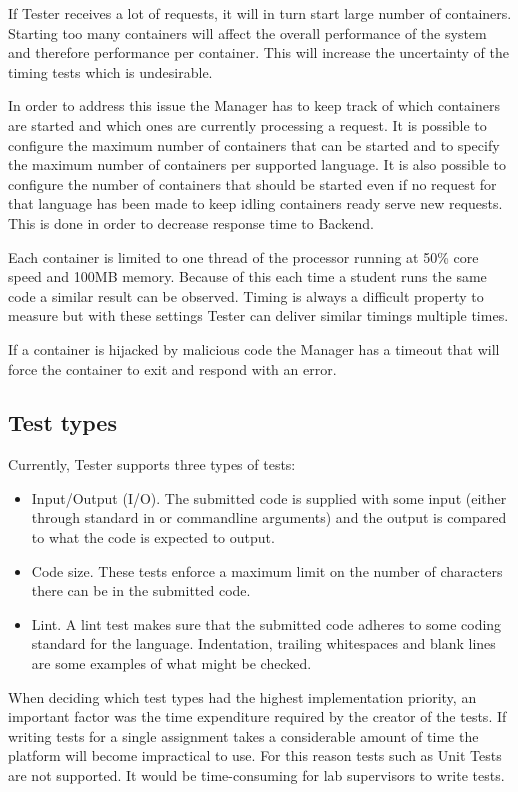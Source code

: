 If Tester receives a lot of requests, it will in turn start large number of containers. Starting too many containers will affect the overall performance of the system and therefore performance per container. This will increase the uncertainty of the timing tests which is undesirable.

In order to address this issue the Manager has to keep track of which containers are started and which ones are currently processing a request. It is possible to configure the maximum number of containers that can be started and to specify the maximum number of containers per supported language. It is also possible to configure the number of containers that should be started even if no request for that language has been made to keep idling containers ready serve new requests. This is done in order to decrease response time to Backend.

Each container is limited to one thread of the processor running at 50\% core speed and 100MB memory. Because of this each time a student runs the same code a similar result can be observed. Timing is always a difficult property to measure but with these settings Tester can deliver similar timings multiple times.

If a container is hijacked by malicious code the Manager has a timeout that will force the container to exit and respond with an error.

\subsection{Test types}\label{sec:testtypes}
Currently, Tester supports three types of tests:
\begin{itemize}
\item Input/Output (I/O). The submitted code is supplied with some input (either through standard in or commandline arguments) and the output is compared to what the code is expected to output.
\item Code size. These tests enforce a maximum limit on the number of characters there can be in the submitted code.
\item Lint. A lint test makes sure that the submitted code adheres to some coding standard for the language. Indentation, trailing whitespaces and blank lines are some examples of what might be checked.
\end{itemize}
When deciding which test types had the highest implementation priority, an important factor was the time expenditure required by the creator of the tests. If writing tests for a single assignment takes a considerable amount of time the platform will become impractical to use. For this reason tests such as Unit Tests are not supported. It would be time-consuming for lab supervisors to write tests.

